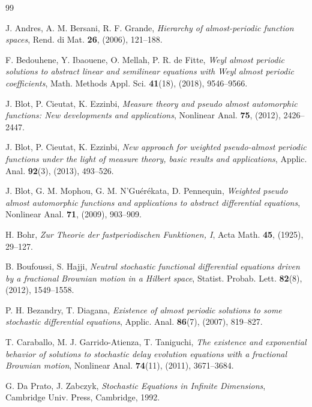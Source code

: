 \documentclass[11pt]{amsart}
\begin{document}
\begin{thebibliography}{99}

J. Andres, A. M. Bersani, R. F. Grande,
\emph{Hierarchy of almost-periodic function spaces},
Rend. di Mat. \textbf{26}, (2006), 121--188.

F. Bedouhene, Y. Ibaouene, O. Mellah, P. R. de Fitte,
\emph{Weyl almost periodic solutions to abstract linear and semilinear equations with Weyl almost periodic coefficients},
Math. Methods Appl. Sci. \textbf{41}(18), (2018), 9546--9566.

J. Blot, P. Cieutat, K. Ezzinbi,
\emph{Measure theory and pseudo almost automorphic functions: New developments and applications},
Nonlinear Anal. \textbf{75}, (2012), 2426--2447.

J. Blot, P. Cieutat, K. Ezzinbi,
\emph{New approach for weighted pseudo-almost periodic functions under the light of measure theory, basic results and applications},
Applic. Anal. \textbf{92}(3), (2013), 493--526.

J. Blot, G. M. Mophou, G. M. N'Gu\'er\'ekata, D. Pennequin,
\emph{Weighted pseudo almost automorphic functions and applications to abstract differential equations},
Nonlinear Anal. \textbf{71}, (2009), 903--909.

H. Bohr,
\emph{Zur Theorie der fastperiodischen Funktionen, I},
Acta Math. \textbf{45}, (1925), 29--127.

B. Boufoussi, S. Hajji,
\emph{Neutral stochastic functional differential equations driven by a fractional Brownian motion in a Hilbert space},
Statist. Probab. Lett. \textbf{82}(8), (2012), 1549--1558.

P. H. Bezandry, T. Diagana,
\emph{Existence of almost periodic solutions to some stochastic differential equations},
Applic. Anal. \textbf{86}(7), (2007), 819--827.

T. Caraballo, M. J. Garrido-Atienza, T. Taniguchi,
\emph{The existence and exponential behavior of solutions to stochastic delay evolution equations with a fractional Brownian motion},
Nonlinear Anal. \textbf{74}(11), (2011), 3671--3684.

G. Da Prato, J. Zabczyk,
\emph{Stochastic Equations in Infinite Dimensions},
Cambridge Univ. Press, Cambridge, 1992.


\end{thebibliography}
\end{document}
